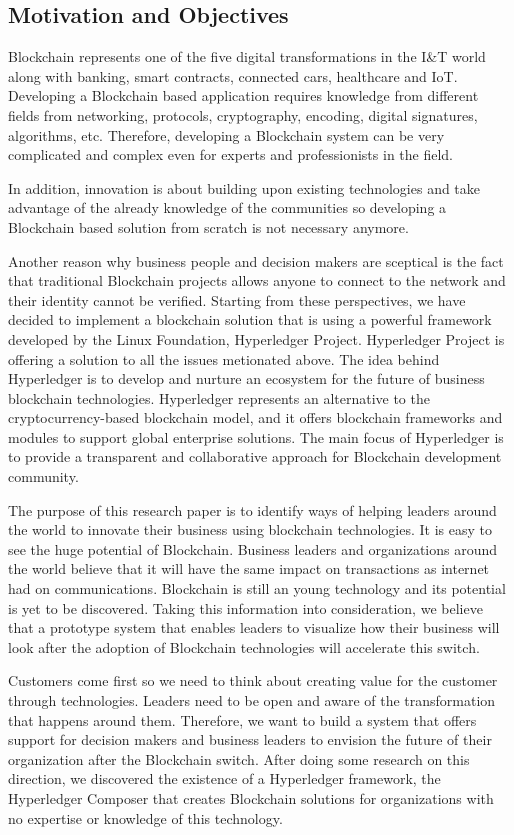 \subsection{Motivation and Objectives}
\label{sub-sec:intro-subsection3}
Blockchain represents one of the five digital transformations in the I\&T world along with banking, smart contracts, connected cars, healthcare and IoT.
Developing a Blockchain based application requires knowledge from different fields from networking, protocols, cryptography, encoding, digital signatures, algorithms, etc. Therefore, developing a Blockchain system can be very complicated and complex even for experts and professionists in the field.

In addition, innovation is about building upon existing technologies and take advantage of the already knowledge of the communities so developing a Blockchain based solution from scratch is not necessary anymore. 

Another reason why business people and decision makers are sceptical is the fact that traditional Blockchain projects allows anyone to connect to the network and their identity cannot be verified. 
Starting from these perspectives, we have decided to implement a blockchain solution that is using a powerful framework developed by the Linux Foundation, Hyperledger Project.
Hyperledger Project is offering a solution to all the issues metionated above. The idea behind Hyperledger is to develop and nurture an ecosystem for the future of business blockchain technologies.
Hyperledger represents an alternative to the cryptocurrency-based blockchain model, and it offers blockchain frameworks and modules to support global enterprise solutions. The main focus of Hyperledger is to provide a transparent and collaborative approach for Blockchain development community.

The purpose of this research paper is to identify ways of helping leaders around the world to innovate their business using blockchain technologies. 
It is easy to see the huge potential of Blockchain. Business leaders and organizations around the world believe that it will have the same impact on transactions as internet had on communications. Blockchain is still an young technology and its potential is yet to be discovered.
Taking this information into consideration, we believe that a prototype system that enables leaders to visualize how their business will look after the adoption of Blockchain technologies will accelerate this switch.

Customers come first so we need to think about creating value for the customer through technologies. Leaders need to be open and aware of the transformation that happens around them. Therefore, we want to build a system that offers support for decision makers and business leaders to envision the future of their organization after the Blockchain switch. 
After doing some research on this direction, we discovered the existence of a Hyperledger framework, the Hyperledger Composer that creates Blockchain solutions for organizations with no expertise or knowledge of this technology.
